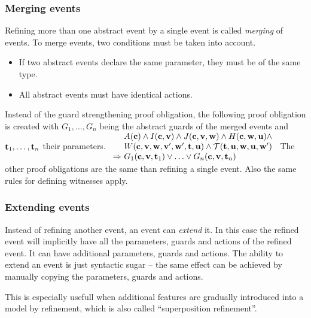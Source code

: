 \subsubsection{Merging events}
\label{merging_events}
Refining more than one abstract event by a single event is called \emph{merging} of events.
To merge events, two conditions must be taken into account.
\begin{itemize}
\item If two abstract events declare the same parameter, they must be of the same type.
\item All abstract events must have identical actions.
\end{itemize}
Instead of the guard strengthening proof obligation, the following proof obligation is
created with $G_1,\ldots,G_n$ being the abstract guards of the merged events
  and $\mathbf{t}_1,\ldots,\mathbf{t}_n$ their parameters.
%
  {$\begin{array}{l@{\ }l}
      & \axioms \land \absinvariants \land \concinvariants \land
      \concguards \land \\
      & \witnesspred \land \bapred \\
      \limp & G_1(\allconstants,\absvariables,\absparameters_1)\lor\ldots\lor G_n(\allconstants,\absvariables,\absparameters_n)      
    \end{array}
$}
The other proof obligations are the same than refining a single event.
Also the same rules for defining witnesses apply.

\subsubsection{Extending events}
\label{extending_events}
Instead of refining another event, an event can \emph{extend} it.
In this case the refined event will implicitly have all the parameters, 
 guards and actions of the refined event. It can have additional parameters,
 guards and actions.
The ability to extend an event is just syntactic sugar -- the same effect
 can be achieved by manually copying the parameters, guards and actions.

This is especially usefull when additional features are gradually introduced
 into a model by refinement, which is also called ``superposition refinement''.

